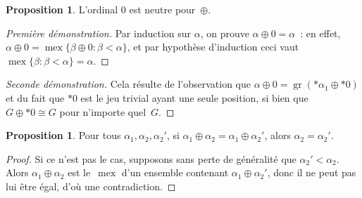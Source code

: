 \documentclass[12pt,a4paper]{article}
\theoremstyle{definition}
\newtheorem{prop}[comcnt]{Proposition}
\newcommand{\mex}{\operatorname{mex}}
\newcommand{\gr}{\operatorname{gr}}
\begin{document}
\begin{prop}\label{zero-is-neutral-for-nim-sum}
L'ordinal $0$ est neutre pour $\oplus$.
\end{prop}
\begin{proof}[Première démonstration]
Par induction sur $\alpha$, on prouve $\alpha \oplus 0 = \alpha$ : en
effet, $\alpha \oplus 0 = \mex \{\beta\oplus 0: \beta<\alpha\}$, et
par hypothèse d'induction ceci vaut $\mex \{\beta: \beta<\alpha\} =
\alpha$.
\end{proof}
\begin{proof}[Seconde démonstration]
Cela résulte de l'observation que $\alpha\oplus 0 = \gr(*\alpha_1
\oplus *0)$ et du fait que $*0$ est le jeu trivial ayant une seule
position, si bien que $G\oplus *0 \cong G$ pour n'importe quel $G$.
\end{proof}

\begin{prop}\label{nim-sum-cancellative}
Pour tous $\alpha_1,\alpha_2,\alpha_2'$, si $\alpha_1\oplus\alpha_2 =
\alpha_1\oplus\alpha_2'$, alors $\alpha_2=\alpha_2'$.
\end{prop}
\begin{proof}
Si ce n'est pas le cas, supposons sans perte de généralité que
$\alpha_2'<\alpha_2$.  Alors $\alpha_1\oplus\alpha_2$ est le $\mex$ d'un
ensemble contenant $\alpha_1\oplus\alpha_2'$, donc il ne peut pas lui
être égal, d'où une contradiction.
\end{proof}
\end{document}
